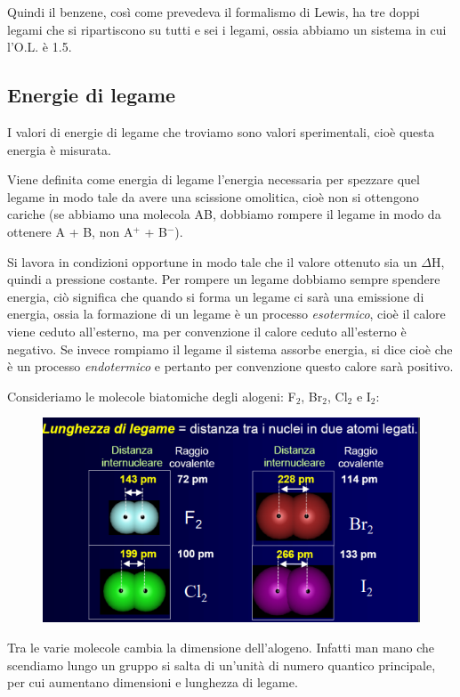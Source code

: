 Quindi il benzene, così come prevedeva il formalismo di Lewis, ha tre doppi legami che si ripartiscono su tutti e sei i legami, ossia abbiamo un sistema in cui l'O.L. è 1.5.
\subsection{Energie di legame}
I valori di energie di legame che troviamo sono valori sperimentali, cioè questa energia è misurata.

Viene definita come energia di legame l'energia necessaria per spezzare quel legame in modo tale da avere una scissione omolitica, cioè non si ottengono cariche (se abbiamo una molecola AB, dobbiamo rompere il legame in modo da ottenere A + B, non A$^+$ + B$^-$).

Si lavora in condizioni opportune in modo tale che il valore ottenuto sia un $\Delta$H, quindi a pressione costante. Per rompere un legame dobbiamo sempre spendere energia, ciò significa  che quando si forma un legame ci sarà una emissione di energia, ossia la formazione di un legame è un processo \textit{esotermico}, cioè il calore viene ceduto all'esterno, ma per convenzione il calore ceduto all'esterno è negativo. Se invece rompiamo il legame il sistema assorbe energia, si dice cioè che è un processo \textit{endotermico} e pertanto per convenzione questo calore sarà positivo.

Consideriamo le molecole biatomiche degli alogeni: F$_2$, Br$_2$, Cl$_2$ e I$_2$:

\begin{figure}[htp]
    \centering
    \includegraphics[width=12cm]{immagini/molecole_biatomiche_alogeni.png}
\end{figure}

Tra le varie molecole cambia la dimensione dell'alogeno. Infatti man mano che scendiamo lungo un gruppo si salta di un'unità di numero quantico principale, per cui aumentano dimensioni e lunghezza di legame.

